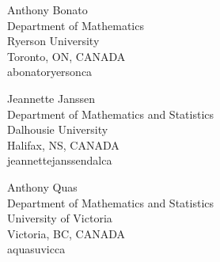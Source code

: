 \documentclass{daj}
\begin{document}
%
%
%

\begin{dajauthors}
\begin{authorinfo}[ab]
  Anthony Bonato\\
  Department of Mathematics\\
  Ryerson University\\
  Toronto, ON, CANADA\\
  abonato\imageat{}ryerson\imagedot{}ca \\
\end{authorinfo}
\begin{authorinfo}[jj]
  Jeannette Janssen\\
  Department of Mathematics and Statistics\\
  Dalhousie University\\
  Halifax, NS, CANADA\\
  jeannette\imagedot{}janssen\imageat{}dal\imagedot{}ca \\
\end{authorinfo}
\begin{authorinfo}[aq]
  Anthony Quas\\
  Department of Mathematics and Statistics\\
  University of Victoria\\
  Victoria, BC, CANADA\\
  aquas\imageat{}uvic\imagedot{}ca\\
\end{authorinfo}
\end{dajauthors}
\end{document}
